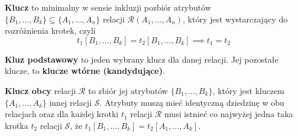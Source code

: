\textbf{Klucz} to minimalny w sensie inkluzji pozbiór atrybutów \( \{B_1, \dots, B_k\} \subseteq \{A_1, \dots, A_n\} \) relacji \( \mathcal{R}(A_1, \dots, A_n) \), który jest wystarczający do rozróżnienia krotek, czyli
\[
    t_1[B_1, \dots, B_k] = t_2[B_1, \dots, B_k] \implies t_1 = t_2
\]

\textbf{Kluz podstawowy} to jeden wybrany klucz dla danej relacji. Jej pozostałe klucze, to \textbf{klucze wtórne (kandydujące)}.

\textbf{Klucz obcy} relacji \( \mathcal{R} \) to zbiór jej atrybutów \( \{B_1, \dots, B_k\} \), który jest kluczem \( \{A_1, \dots, A_k\} \) innej relacji \( \mathcal{S} \). Atrybuty muszą mieć identyczną dziedzinę w obu relacjach oraz 
dla każdej krotki \(t_1 \) relacji \( \mathcal{R} \) musi istnieć co najwyżej jedna taka krotka \( t_2 \) relacji \( \mathcal{S} \), że \( t_1[B_1, \dots, B_k] = t_2[A_1, \dots, A_k] \).